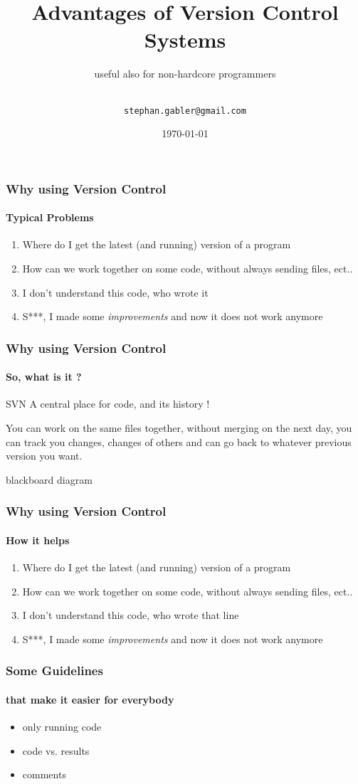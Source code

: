 \documentclass{beamer}
\title[Intro to GIT] {Advantages of Version Control Systems}
\subtitle{useful also for non-hardcore programmers}
\author[Stephan Gabler] { \\\texttt{stephan.gabler@gmail.com}}
\date{\today}
\begin{document}
\frame{\titlepage}


\begin{frame}
	\frametitle{Why using Version Control}
	\framesubtitle{Typical Problems}
	\begin{enumerate}
		\item<1-> Where do I get the latest (and running) version of a program
		\item<2-> How can we work together on some code, without always sending files, ect..
		\item<3-> I don't understand this code, who wrote it
		\item<4-> S***, I made some \emph{improvements} and now it does not work anymore 
	\end{enumerate}
\end{frame}


\begin{frame}
	\frametitle{Why using Version Control}
	\framesubtitle{So, what is it ?}
	
	\begin{block}{SVN}
		A central place for code, and \alert{its history} !
	\end{block}

	You can work on the same files together, without merging on the next day,
	you can track you changes, changes of others and can go back to whatever
	previous version you want.

	blackboard diagram
	
\end{frame}


\begin{frame}
	\frametitle{Why using Version Control}
	\framesubtitle{How it helps}
	
	\begin{enumerate}
		\item<1-> Where do I get the latest (and running) version of a program
		\item<2-> How can we work together on some code, without always sending files, ect..
		\item<3-> I don't understand this code, who wrote that line
		\item<4-> S***, I made some \emph{improvements} and now it does not work anymore 
	\end{enumerate}
	
\end{frame}

\begin{frame}
	\frametitle{Some Guidelines}
	\framesubtitle{that make it easier for everybody}

	\begin{itemize}
		\item<1->only running code
		\item<2-> code vs. results
		\item<3-> comments
	\end{itemize}
\end{frame}
\end{document}
